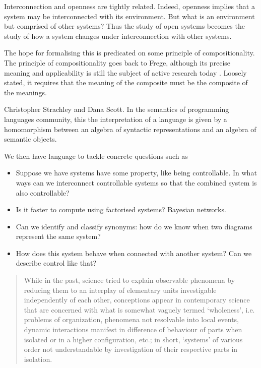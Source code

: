 Interconnection and openness are tightly related. Indeed, openness implies that
a system may be interconnected with its environment. But what is an environment
but comprised of other systems? Thus the study of open systems becomes the study
of how a system changes under interconnection with other systems.

The hope for formalising this is predicated on some principle of
compositionality. The principle of compositionality goes back to Frege, although
its precise meaning and applicability is still the subject of active research
today \cite{Sza13}. Loosely stated, it requires
that the meaning of the composite must be the composite of the meanings.

Christopher Strachley and Dana Scott. In the semantics of programming languages
community, this the interpretation of a language is given by a homomorphism
between an algebra of syntactic representations and an algebra of semantic
objects.



We then have language to tackle concrete questions such as
\begin{itemize}
  \item Suppose we have systems have some property, like being controllable. In
    what ways can we interconnect controllable systems so that the combined
    system is also controllable?

  \item Is it faster to compute using factorised systems? Bayesian networks.

  \item Can we identify and classify synonyms: how do we know when two diagrams
    represent the same system?

  \item How does this system behave when connected with another system? Can we
    describe control like that? 

\end{itemize}


\begin{quotation}
  While in the past, science tried to explain observable phenomena by reducing
  them to an interplay of elementary units investigable independently of each
  other, conceptions appear in contemporary science that are concerned with what
  is somewhat vaguely termed `wholeness', i.e. problems of organization,
  phenomena not resolvable into local events, dynamic interactions manifest in
  difference of behaviour of parts when isolated or in a higher configuration,
  etc.; in short, `systems' of various order not understandable by investigation
  of their respective parts in isolation. 
\end{quotation}

